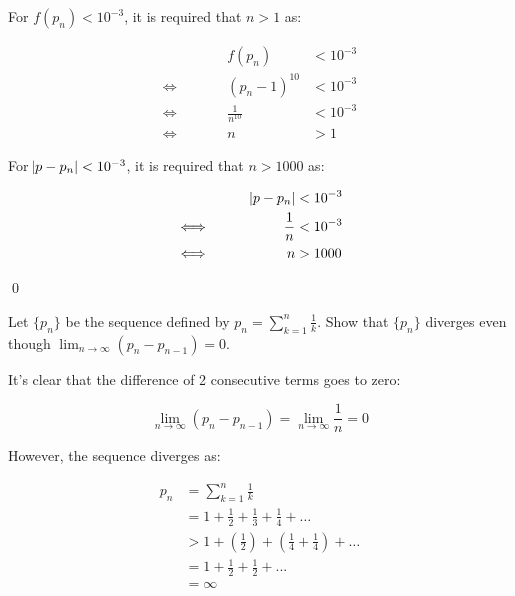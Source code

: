 \documentclass[../../Assignments.tex]{subfiles}
\begin{document}
\begin{solution}
    For \(f(p_n) < 10^{-3}\), it is required that \(n > 1\) as:

    \begin{align*}
        &\qquad&         f(p_n) & < 10^{-3} \\
        \iff&&   (p_n - 1)^{10} & < 10^{-3} \\
        \iff&& \frac{1}{n^{10}} & < 10^{-3} \\
        \iff&&                n & > 1
    \end{align*}

    For \(\abs{p - p_n} < 10^{-3}\), it is required that \(n > 1000\) as:

    \begin{align*}
        &\qquad& \abs{p - p_n} & < 10^{-3} \\
        \iff&&     \frac{1}{n} & < 10^{-3} \\
        \iff&&               n & > 1000
    \end{align*}

    \qed
\end{solution}

\begin{exercise}
    Let \(\{p_n\}\) be the sequence defined by \(p_n = \sum_{k = 1}^{n}
    \frac{1}{k}\). Show that \(\{p_n\}\) diverges even though \(\lim_{n \to
    \infty} (p_n - p_{n - 1}) = 0\).
\end{exercise}

\begin{solution}
    It's clear that the difference of 2 consecutive terms goes to zero:

    \[\lim_{n \to \infty} (p_n - p_{n - 1}) = \lim_{n \to \infty} \frac{1}{n} = 0\]

    However, the sequence diverges as:

    \[\begin{aligned}
        p_n & = \sum_{k = 1}^{n} \frac{1}{k} \\
            & = 1 + \frac{1}{2} + \frac{1}{3} + \frac{1}{4} + \ldots \\
            & > 1 + (\frac{1}{2}) + (\frac{1}{4} + \frac{1}{4}) + \ldots \\
            & = 1 + \frac{1}{2} + \frac{1}{2} + ... \\
            & = \infty
    \end{aligned}\]
\end{solution}
\end{document}
